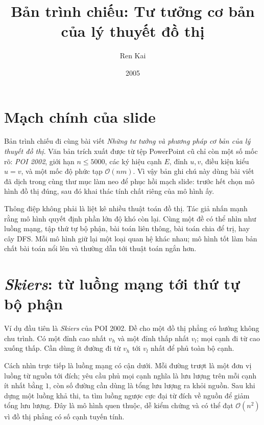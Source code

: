 \documentclass[11pt]{article}
\title{Bản trình chiếu: Tư tưởng cơ bản của lý thuyết đồ thị}
\author{Ren Kai}
\date{2005}
\newcommand{\Oh}{\mathcal{O}}
\begin{document}
\maketitle


\section{Mạch chính của slide}

Bản trình chiếu đi cùng bài viết \emph{Những tư tưởng và phương pháp cơ bản
của lý thuyết đồ thị}. Văn bản trích xuất được từ tệp PowerPoint cũ chỉ còn
một số mốc rõ: \textit{POI 2002}, giới hạn \(n\le 5000\), các ký hiệu cạnh
\(E\), đỉnh \(u,v\), điều kiện kiểu \(u=v\), và một mốc độ phức tạp
\(\Oh(nm)\). Vì vậy bản ghi chú này dùng bài viết đã dịch trong cùng thư mục
làm neo để phục hồi mạch slide: trước hết chọn mô hình đồ thị đúng, sau đó
khai thác tính chất riêng của mô hình ấy.

Thông điệp không phải là liệt kê nhiều thuật toán đồ thị. Tác giả nhấn mạnh
rằng mô hình quyết định phần lớn độ khó còn lại. Cùng một đề có thể nhìn như
luồng mạng, tập thứ tự bộ phận, bài toán liên thông, bài toán chia để trị, hay
cây DFS. Mỗi mô hình giữ lại một loại quan hệ khác nhau; mô hình tốt làm bản
chất bài toán nổi lên và thường dẫn tới thuật toán ngắn hơn.

\section{\textit{Skiers}: từ luồng mạng tới thứ tự bộ phận}

Ví dụ đầu tiên là \textit{Skiers} của POI 2002. Đề cho một đồ thị phẳng có
hướng không chu trình. Có một đỉnh cao nhất \(v_h\) và một đỉnh thấp nhất
\(v_l\); mọi cạnh đi từ cao xuống thấp. Cần dùng ít đường đi từ \(v_h\) tới
\(v_l\) nhất để phủ toàn bộ cạnh.

Cách nhìn trực tiếp là luồng mạng có cận dưới. Mỗi đường trượt là một đơn vị
luồng từ nguồn tới đích; yêu cầu phủ mọi cạnh nghĩa là lưu lượng trên mỗi cạnh
ít nhất bằng \(1\), còn số đường cần dùng là tổng lưu lượng ra khỏi nguồn. Sau
khi dựng một luồng khả thi, ta tìm luồng ngược cực đại từ đích về nguồn để
giảm tổng lưu lượng. Đây là mô hình quen thuộc, dễ kiểm chứng và có thể đạt
\(\Oh(n^2)\) vì đồ thị phẳng có số cạnh tuyến tính.
\end{document}

